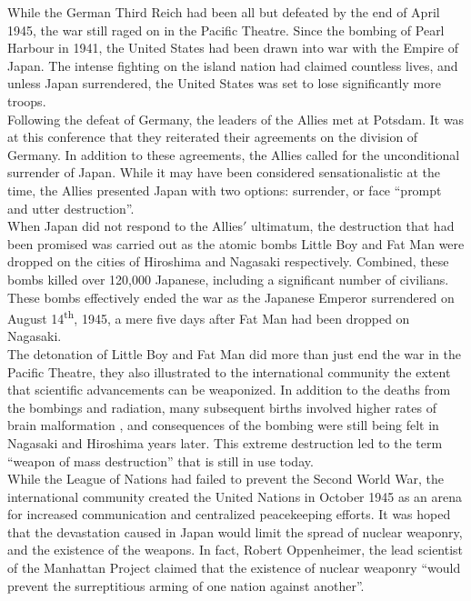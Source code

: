 \documentclass[12pt]{article}
\begin{document}
While the German Third Reich had been all but defeated by the end of April 1945\cite{1}, the war still raged on in the Pacific Theatre. Since the bombing of Pearl Harbour in 1941, the United States had been drawn into war with the Empire of Japan\cite{2}. The intense fighting on the island nation had claimed countless lives, and unless Japan surrendered, the United States was set to lose significantly more troops.\\

Following the defeat of Germany, the leaders of the Allies met at Potsdam. It was at this conference that they reiterated their agreements on the division of Germany\cite{3}. In addition to these agreements, the Allies called for the unconditional surrender of Japan\cite{3}. While it may have been considered sensationalistic at the time, the Allies presented Japan with two options: surrender, or face “prompt and utter destruction”\cite{3}.\\

When Japan did not respond to the Allies$'$ ultimatum, the destruction that had been promised was carried out as the atomic bombs Little Boy and Fat Man were dropped on the cities of Hiroshima and Nagasaki respectively\cite{4}. Combined, these bombs killed over 120,000 Japanese, including a significant number of civilians\cite{4}. These bombs effectively ended the war as the Japanese Emperor surrendered on August 14\textsuperscript{th}, 1945, a mere five days after Fat Man had been dropped on Nagasaki\cite{4}.\\

The detonation of Little Boy and Fat Man did more than just end the war in the Pacific Theatre, they also illustrated to the international community the extent that scientific advancements can be weaponized. In addition to the deaths from the bombings and radiation, many subsequent births involved higher rates of brain malformation \cite{5}, and consequences of the bombing were still being felt in Nagasaki and Hiroshima years later. This extreme destruction led to the term “weapon of mass destruction” that is still in use today.\\
 
While the League of Nations had failed to prevent the Second World War\cite{6}, the international community created the United Nations  in October 1945 as an arena for increased communication and centralized peacekeeping efforts\cite{7}. It was hoped that the devastation caused in Japan would limit the spread of nuclear weaponry, and the existence of the weapons. In fact, Robert Oppenheimer, the lead scientist of the Manhattan Project claimed that the existence of nuclear weaponry ``would prevent the surreptitious arming of one nation against another''\cite{8}.\\
\end{document}
